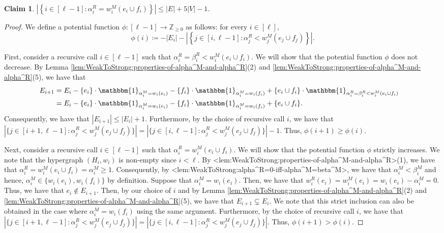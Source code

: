 \documentclass{article}
\def\Cref#1{<#1>}%
\newtheorem{claim}{Claim}[section]
\newcommand{\indicator}{\ensuremath{\mathbbm{1}}\xspace}
\newcommand{\kristof}[1]{{\color{purple}[{\tiny Kristof: \bf #1}]\marginpar{\color{red}*}}}
\providecommand{\Z}{\mathbb{Z}}
\begin{document}
\begin{claim}\label{claim:WeakToStrong:hyperedge-support-size:alpha^R<weight-of-added-hyperedge}
    $\left|\left\{i \in [\ell - 1] : \alpha_i^R = w_i^M(e_i \cup f_i)\right\}\right| \leq |E| + 5|V| - 1$. %
\end{claim}
\begin{proof}
    We define a potential function $\phi:[\ell - 1] \rightarrow \Z_{\geq 0}$ as follows: for every $i \in [\ell]$,
    $$\phi(i) \coloneqq  -|E_i| - \left|\left\{j \in [i,\ell - 1] : \alpha_j^R < w_j^M(e_j\cup f_j)\right\}\right|.$$
    
    First, consider a recursive call $i \in [\ell - 1]$ such that $\alpha_i^R = \beta_i^R < w_i^M(e_i \cup f_i)$. We will show that the potential function $\phi$ does not decrease. By Lemma \ref{lem:WeakToStrong:properties-of-alpha^M-and-alpha^R}(2) and \ref{lem:WeakToStrong:properties-of-alpha^M-and-alpha^R}(5), we have that 
    \begin{align*}
       E_{i+1} & = E_i - \{e_i\}\cdot \indicator_{\alpha_i^M = w_i(e_i)} - \{f_i\}\cdot \indicator_{\alpha_i^M = w_i(f_i)} + \{e_i\cup f_i\}\cdot \indicator_{\alpha_i^R = \beta_i^R < w_i^M(e_i \cup f_i)}&\\
        &= E_i - \{e_i\}\cdot \indicator_{\alpha_i^M = w_i(e_i)} - \{f_i\}\cdot \indicator_{\alpha_i^M = w_i(f_i)} + \{e_i\cup f_i\}.&
    \end{align*}
Consequently, 
    we have that $|E_{i+1}| \leq |E_i| + 1$. Furthermore, by the choice of recursive call $i$, we have that $\left|\{j \in [i+1, \ell - 1] : \alpha_j^R < w_j^M(e_j\cup f_j)\}\right| = \left|\{j \in [i, \ell - 1] : \alpha_j^R < w_j^M(e_j\cup f_j)\}\right| - 1$. Thus, $\phi(i+1) \geq \phi(i)$.
    
     Next, consider a recursive call $i \in [\ell - 1]$ such that $\alpha_i^R = w_i^M(e_i \cup f_i)$. We will show that the potential function $\phi$ strictly increases. We note that the hypergraph $(H_i, w_i)$ is non-empty since $i < \ell$.  
     By \Cref{lem:WeakToStrong:properties-of-alpha^M-and-alpha^R}(1), we have that $\alpha_i^R = w_i^M(e_i \cup f_i) = \alpha_i^M \geq 1$. 
     Consequently, by  \Cref{lem:WeakToStrong:alpha^R=0-iff-alpha^M=beta^M}, we have that $\alpha_i^M  < \beta_i^M$ and hence, $\alpha_i^M \in \{w_i(e_i), w_i(f_i)\}$ by definition. 
     Suppose that $\alpha_i^M = w_i(e_i)$. 
     Then, we have that $w^R_i(e_i) = w^M_i(e_i) = w_i(e_i) - \alpha_{i}^M = 0$. 
     Thus, we have that $e_i \not \in E_{i+1}$. 
     Then, by our choice of $i$ and by Lemma \ref{lem:WeakToStrong:properties-of-alpha^M-and-alpha^R}(2) and \ref{lem:WeakToStrong:properties-of-alpha^M-and-alpha^R}(5), we have that $E_{i+1} \subsetneq E_i$. 
     We note that this strict inclusion can also be obtained in the case where $\alpha_i^M = w_i(f_i)$ using the same argument. Furthermore, by the choice of recursive call $i$, we have that $\left|\{j \in [i+1, \ell - 1] : \alpha_j^R < w_j^M(e_j\cup f_j)\}\right| = \left|\{j \in [i, \ell - 1] : \alpha_j^R < w_j^M(e_j\cup f_j)\}\right|$.
     Thus, $\phi(i+1) > \phi(i)$.


\end{proof}
\end{document}
